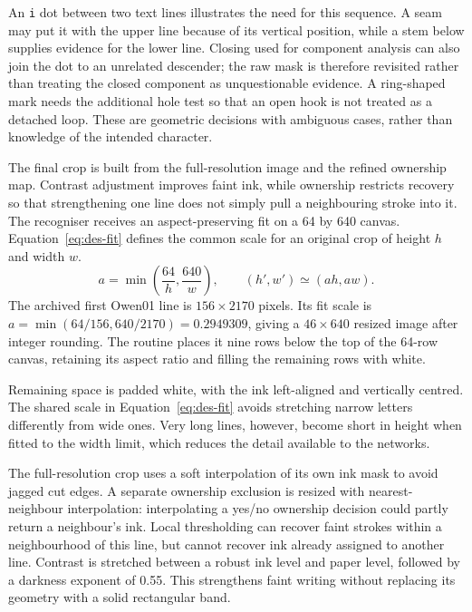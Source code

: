 An \texttt{i} dot between two text lines illustrates the need for this sequence. A seam may put it with the upper line because of its vertical position, while a stem below supplies evidence for the lower line. Closing used for component analysis can also join the dot to an unrelated descender; the raw mask is therefore revisited rather than treating the closed component as unquestionable evidence. A ring-shaped mark needs the additional hole test so that an open hook is not treated as a detached loop. These are geometric decisions with ambiguous cases, rather than knowledge of the intended character.

The final crop is built from the full-resolution image and the refined ownership map. Contrast adjustment improves faint ink, while ownership restricts recovery so that strengthening one line does not simply pull a neighbouring stroke into it. The recogniser receives an aspect-preserving fit on a 64 by 640 canvas. Equation~\ref{eq:des-fit} defines the common scale for an original crop of height $h$ and width $w$.
\begin{equation}
a=\min\left(\frac{64}{h},\frac{640}{w}\right),\qquad
(h',w')\simeq(ah,aw).
\label{eq:des-fit}
\end{equation}
The archived first Owen01 line is $156\times2170$ pixels. Its fit scale is $a=\min(64/156,640/2170)=0.2949309$, giving a $46\times640$ resized image after integer rounding. The routine places it nine rows below the top of the 64-row canvas, retaining its aspect ratio and filling the remaining rows with white.

Remaining space is padded white, with the ink left-aligned and vertically centred. The shared scale in Equation~\ref{eq:des-fit} avoids stretching narrow letters differently from wide ones. Very long lines, however, become short in height when fitted to the width limit, which reduces the detail available to the networks.

The full-resolution crop uses a soft interpolation of its own ink mask to avoid jagged cut edges. A separate ownership exclusion is resized with nearest-neighbour interpolation: interpolating a yes/no ownership decision could partly return a neighbour's ink. Local thresholding can recover faint strokes within a neighbourhood of this line, but cannot recover ink already assigned to another line. Contrast is stretched between a robust ink level and paper level, followed by a darkness exponent of 0.55. This strengthens faint writing without replacing its geometry with a solid rectangular band.

